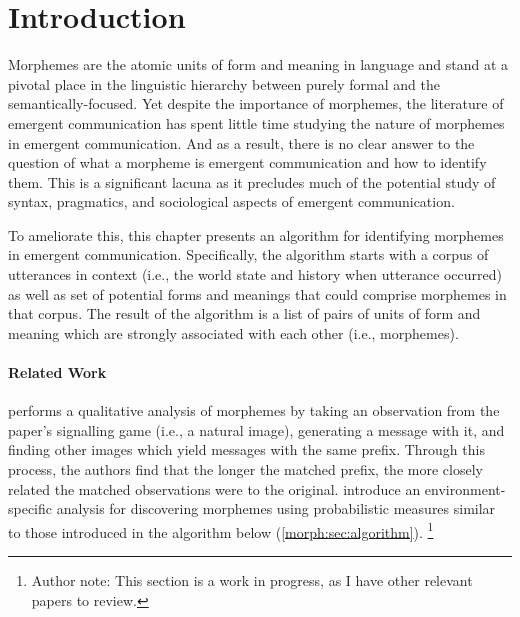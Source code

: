 \section{Introduction}
Morphemes are the atomic units of form and meaning in language and stand at a pivotal place in the linguistic hierarchy between purely formal and the semantically-focused.
Yet despite the importance of morphemes, the literature of emergent communication has spent little time studying the nature of morphemes in emergent communication.
And as a result, there is no clear answer to the question of what a morpheme is emergent communication and how to identify them.
This is a significant lacuna as it precludes much of the potential study of syntax, pragmatics, and sociological aspects of emergent communication.

To ameliorate this, this chapter presents an algorithm for identifying morphemes in emergent communication.
Specifically, the algorithm starts with a corpus of utterances in context (i.e., the world state and history when utterance occurred) as well as set of potential forms and meanings that could comprise morphemes in that corpus.
The result of the algorithm is a list of pairs of units of form and meaning which are strongly associated with each other (i.e., morphemes).



\paragraph{Related Work}
\citet{havrylov2017sequence} performs a qualitative analysis of morphemes by taking an observation from the paper's signalling game (i.e., a natural image), generating a message with it, and finding other images which yield messages with the same prefix.
Through this process, the authors find that the longer the matched prefix, the more closely related the matched observations were to the original.
\citet{lipinski2024speaking} introduce an environment-specific analysis for discovering morphemes using probabilistic measures similar to those introduced in the algorithm below (\cref{morph:sec:algorithm}).
\unskip\footnote{Author note: This section is a work in progress, as I have other relevant papers to review.}

% 
% 


